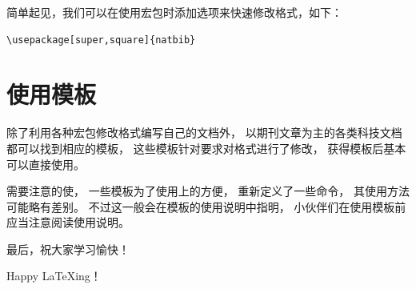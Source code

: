 \documentclass{ctexart}
\numberwithin{equation}{section}			%
\begin{document}
	简单起见，我们可以在使用宏包时添加选项来快速修改格式，如下：
	
\begin{lstlisting}
\usepackage[super,square]{natbib}
\end{lstlisting}
		
	\section{使用模板}
	除了利用各种宏包修改格式编写自己的文档外，
	以期刊文章为主的各类科技文档都可以找到相应的模板，
	这些模板针对要求对格式进行了修改，
	获得模板后基本可以直接使用。
	
	需要注意的使，
	一些模板为了使用上的方便，
	重新定义了一些命令，
	其使用方法可能略有差别。
	不过这一般会在模板的使用说明中指明，
	小伙伴们在使用模板前应当注意阅读使用说明。
	
	最后，祝大家学习愉快！
	
	Happy \LaTeX ing！
	
	
	
\end{document}
